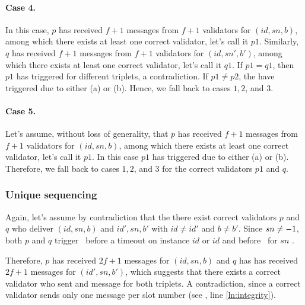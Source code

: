 \paragraph{Case 4.}
In this case, $p$ has received $f+1$ \checkpoint messages from $f+1$ validators for $(id, sn, b)$, among which there exists at least one correct validator, let's call it $p1$.
Similarly, $q$ has received $f+1$ \checkpoint messages from $f+1$ validators for $(id, sn', b')$, among which there exists at least one correct validator, let's call it $q1$.
If $p1=q1$, then $p1$ has triggered \bbcadeliver for different triplets, a contradiction.
If $p1\neq p2$, the have triggered \bbcadeliver due to either (a) or (b). Hence, we fall back to cases $1,2$, and $3$.

\paragraph{Case 5.}
Let's assume, without loss of generality, that $p$ has received $f+1$ \checkpoint messages from $f+1$ validators for $(id, sn, b)$,  among which there exists at least one correct validator, let's call it $p1$.
In this case $p1$ has triggered \bbcadeliver due to either (a) or (b).
Therefore, we fall back to cases $1,2$, and $3$ for the correct validators $p1$ and $q$.

\subsubsection{Unique sequencing}
\label{sec:bbca-sequencing}
Again, let's assume by contradiction that the there exist correct validators $p$ and $q$ who \primitivesmall deliver $(id, sn, b)$ and $id', sn, b'$ with $id\neq id'$ and $b\neq b'$.
Since $sn\neq-1$, both $p$ and $q$  trigger \bbcadeliver\ before a timeout on instance $id$ or $id$ and before \bbcaabort\ for $sn$ .

Therefore, $p$ has received $2f+1$ \echo messages for $(id, sn, b)$ and $q$ has  has received $2f+1$ \echo messages for $(id', sn, b')$, which suggests that there exists a correct validator who sent and \echo message for both triplets.
A contradiction, since a correct validator sends only one \echo message per slot number (see , line \ref{ln:integrity}).

